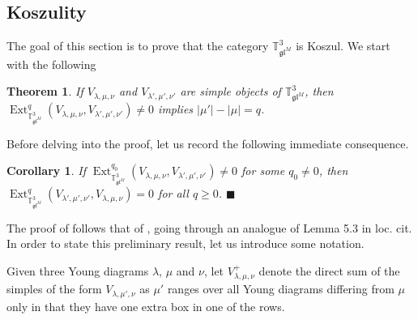 \documentclass[11pt]{article}
\theoremstyle{plain}
\newtheorem{corollary}[lemma]{Corollary}
\newtheorem{theorem}[lemma]{Theorem}
\theoremstyle{nonumberplain}
\theoremstyle{plain}
\theoremstyle{nonumberplain}
\newcommand\bT{{\mathbb T}}
\newcommand\fgl{\mathfrak{gl}}
\DeclareMathOperator{\Ext}{\mathrm{Ext}}
\newcommand{\qedhere}{\mbox{}\hfill\ensuremath{\blacksquare}}
\begin{document}

\subsection{Koszulity}
\label{subse.Kosz}


The goal of this section is to prove that the category $\bT^3_{\fgl^M}$ is Koszul. We start with the following



\begin{theorem}\label{th.Kosz}
If $V_{\lambda,\mu,\nu}$ and $V_{\lambda',\mu',\nu'}$ are simple objects of $\bT^3_{\fgl^M}$, then $\Ext^q_{\bT^3_{\fgl^M}}(V_{\lambda,\mu,\nu},
V_{\lambda',\mu',\nu'})\ne 0$ implies $|\mu'|-|\mu| = q$.
\end{theorem}



Before delving into the proof, let us record the following immediate
consequence. 



\begin{corollary}\label{cor.extq0}
	If $\Ext^{q_0}_{\bT^3_{\fgl^M}}(V_{\lambda,\mu,\nu},
V_{\lambda',\mu',\nu'})\ne 0$ for some $q_0\neq 0$, then $\Ext^q_{\bT^3_{\fgl^M}}(
V_{\lambda',\mu',\nu'},V_{\lambda,\mu,\nu})= 0$ for all $q\geq 0$.
\qedhere
\end{corollary}







The proof of  follows that of \cite[Proposition 5.4]{DPS}, going through an analogue of Lemma 5.3 in loc. cit. In order to state this preliminary result, let us introduce some notation. 

Given three Young diagrams $\lambda$, $\mu$ and $\nu$, let $V_{\lambda,\mu,\nu}^+$ denote the direct sum of the simples of the form $V_{\lambda,\mu',\nu}$ as $\mu'$ ranges over all Young diagrams differing from $\mu$ only in that they have one extra box in one of the rows.  
\end{document}
